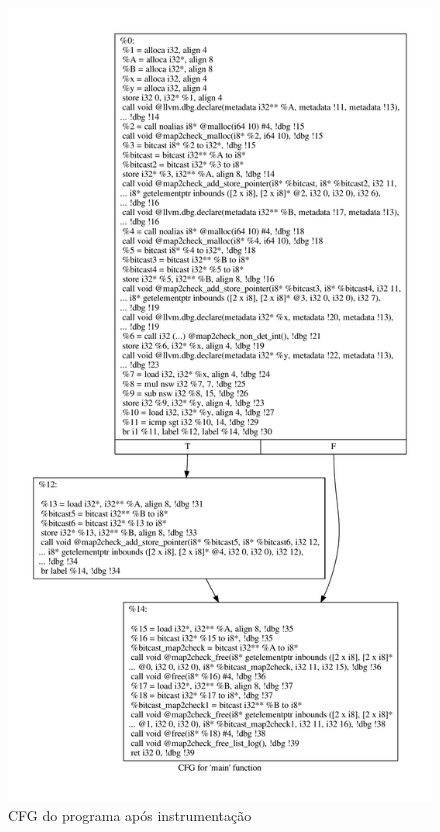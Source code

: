 \begin{figure}[H]
	\caption{\label{fig:cfg_pass} CFG do programa após instrumentação}
	\begin{center}
	    \includegraphics[scale=0.45]{resources/cfg_pass.pdf}
	\end{center}
\end{figure}

